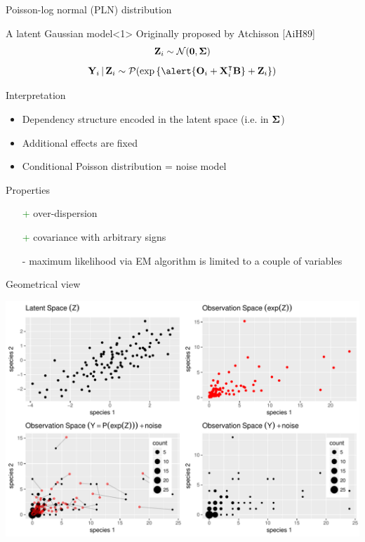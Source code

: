 \documentclass[10pt, c, xcolor=x11names]{beamer}\usepackage[]{graphicx}\usepackage[]{color}
\newenvironment{knitrout}{}{} %
\begin{document}
\begin{frame}{{P}oisson-log normal (PLN) distribution}

  \begin{block}{A latent Gaussian model}<1>
  Originally proposed by Atchisson [AiH89]
  \[
    \mathbf{Z}_i \sim \mathcal{N}(\mathbf{0}, \boldsymbol\Sigma)
  \]
  \[
    \bY_i \,|\, \bZ_i \sim \clP(\exp{\{\alert{\bO_i + \bX_i^\intercal \bB} + \bZ_i\}})
  \]
  \end{block}

  \vfill

  \begin{block}{Interpretation}
    \vspace{-.25cm}
  \begin{itemize}
   \item Dependency structure encoded in the latent space (i.e. in $\boldsymbol{\Sigma}$)
   \item Additional effects are fixed
   \item Conditional Poisson distribution = noise model
  \end{itemize}
  \end{block}

  \begin{block}{Properties}
    \vspace{-.25cm}
      \begin{itemize}
        \item[\textcolor{green}{+}] over-dispersion
        \item[\textcolor{green}{+}] covariance with arbitrary signs
        \item[\textcolor{mred}{-}] maximum likelihood via EM algorithm is limited to a couple of variables
      \end{itemize}
  \end{block}

\end{frame}

\begin{frame}{Geometrical view}

\begin{knitrout}\scriptsize
{}\color{fgcolor}
\includegraphics[width=.8\textwidth]{figures/PLN_geom-1} 

\end{knitrout}

\end{frame}
\end{document}
